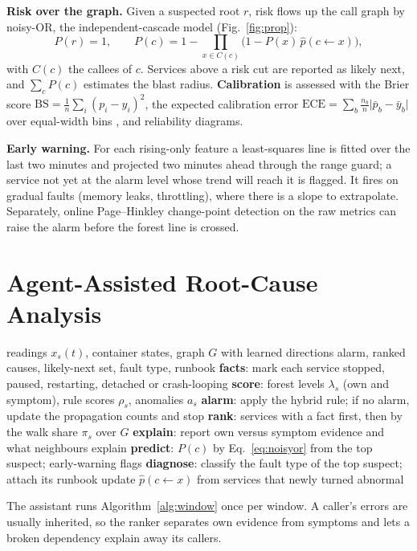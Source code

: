\documentclass[journal]{IEEEtran}
\begin{document}
\textbf{Risk over the graph.} Given a suspected root $r$, risk flows up the call graph by noisy-OR, the independent-cascade model
\cite{kempe2003influence} (Fig.~\ref{fig:prop}):
\begin{equation}
P(r)=1,\qquad P(c)=1-\!\!\prod_{x\in C(c)}\!\!\bigl(1-P(x)\,\hat p(c\!\leftarrow\!x)\bigr),
\label{eq:noisyor}
\end{equation}
with $C(c)$ the callees of $c$. Services above a risk cut are reported as likely next, and $\sum_c P(c)$ estimates the blast radius.
\textbf{Calibration} is assessed with the Brier score \cite{brier1950verification}
$\mathrm{BS}=\frac1n\sum_i(p_i-y_i)^2$, the expected calibration error
$\mathrm{ECE}=\sum_b\frac{n_b}{n}\lvert\bar p_b-\bar y_b\rvert$ over equal-width bins \cite{guo2017calibration}, and reliability diagrams.

\textbf{Early warning.} For each rising-only feature a least-squares line is fitted over the last two minutes and projected two minutes
ahead through the range guard; a service not yet at the alarm level whose trend will reach it is flagged. It fires on gradual faults
(memory leaks, throttling), where there is a slope to extrapolate. Separately, online Page--Hinkley change-point detection
\cite{page1954cusum} on the raw metrics can raise the alarm before the forest line is crossed.

\section{Agent-Assisted Root-Cause Analysis}
\label{sec:rca}
\begin{algorithm}[t]
\caption{One decision window of the diagnosis assistant}
\label{alg:window}
\begin{algorithmic}[1]
\Require readings $x_s(t)$, container states, graph $G$ with learned directions
\Ensure alarm, ranked causes, likely-next set, fault type, runbook
\State \textbf{facts}: mark each service stopped, paused, restarting, detached or crash-looping
\State \textbf{score}: forest levels $\lambda_s$ (own and symptom), rule scores $\rho_s$, anomalies $a_s$
\State \textbf{alarm}: apply the hybrid rule; if no alarm, update the propagation counts and stop
\State \textbf{rank}: services with a fact first, then by the walk share $\pi_s$ over $G$
\State \textbf{explain}: report own versus symptom evidence and what neighbours explain
\State \textbf{predict}: $P(c)$ by Eq.~\eqref{eq:noisyor} from the top suspect; early-warning flags
\State \textbf{diagnose}: classify the fault type of the top suspect; attach its runbook
\State update $\hat p(c\!\leftarrow\!x)$ from services that newly turned abnormal
\end{algorithmic}
\end{algorithm}
The assistant runs Algorithm~\ref{alg:window} once per window. A caller's errors are usually inherited, so the ranker separates own
evidence from symptoms and lets a broken dependency explain away its callers.
\end{document}
